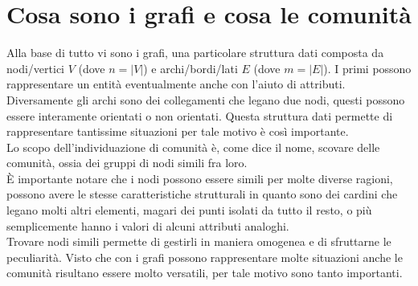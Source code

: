 \section{Cosa sono i grafi e cosa le comunità}
Alla base di tutto vi sono i grafi, una particolare struttura dati composta da nodi/vertici $V$ (dove $n=|V|$) e archi/bordi/lati $E$ (dove $m=|E|$). I primi possono rappresentare un entità eventualmente anche con l'aiuto di attributi. Diversamente gli archi sono dei collegamenti che legano due nodi, questi possono essere interamente orientati o non orientati. Questa struttura dati permette di rappresentare tantissime situazioni per tale motivo è così importante.\\
Lo scopo dell'individuazione di comunità è, come dice il nome, scovare delle comunità, ossia dei gruppi di nodi simili fra loro.\\
È importante notare che i nodi possono essere simili per molte diverse ragioni, possono avere le stesse caratteristiche strutturali in quanto sono dei cardini che legano molti altri elementi, magari dei punti isolati da tutto il resto, o più semplicemente hanno i valori di alcuni attributi analoghi.\\
Trovare nodi simili permette di gestirli in maniera omogenea e di sfruttarne le peculiarità. Visto che con i grafi possono rappresentare molte situazioni anche le comunità risultano essere molto versatili, per tale motivo sono tanto importanti.
%
